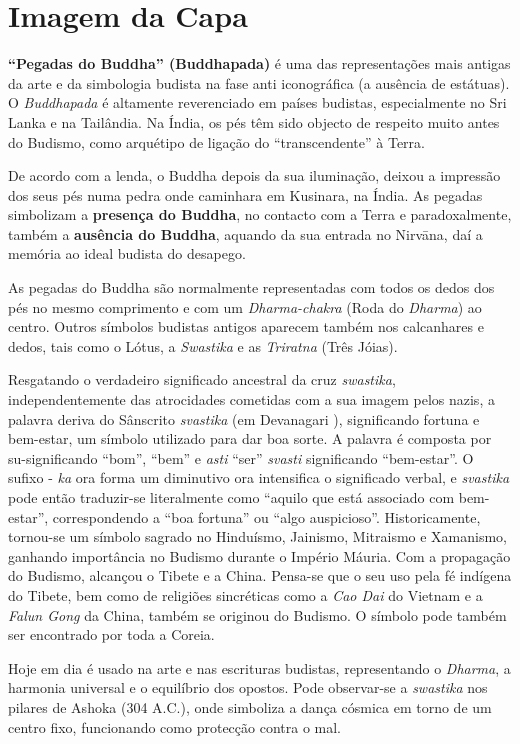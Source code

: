 \chapter{Imagem da Capa}

\textbf{``Pegadas do Buddha'' (Buddhapada)} é uma das representações mais
antigas da arte e da simbologia budista na fase anti iconográfica (a ausência de
estátuas). O \emph{Buddhapada} é altamente reverenciado em países budistas,
especialmente no Sri Lanka e na Tailândia. Na Índia, os pés têm sido objecto de
respeito muito antes do Budismo, como arquétipo de ligação do ``transcendente''
à Terra.

De acordo com a lenda, o Buddha depois da sua iluminação, deixou a impressão dos
seus pés numa pedra onde caminhara em Kusinara, na Índia. As pegadas simbolizam
a \textbf{presença do Buddha}, no contacto com a Terra e paradoxalmente, também
a \textbf{ausência do Buddha}, aquando da sua entrada no Nirvāna, daí a memória
ao ideal budista do desapego.

As pegadas do Buddha são normalmente representadas com todos os dedos dos pés no
mesmo comprimento e com um \emph{Dharma-chakra} (Roda do \emph{Dharma}) ao
centro. Outros símbolos budistas antigos aparecem também nos calcanhares e
dedos, tais como o Lótus, a \emph{Swastika} e as \emph{Triratna} (Três Jóias).

Resgatando o verdadeiro significado ancestral da cruz \emph{swastika},
independentemente das atrocidades cometidas com a sua imagem pelos nazis, a
palavra deriva do Sânscrito \emph{svastika} (em Devanagari ),
significando fortuna e bem-estar, um símbolo utilizado para dar boa sorte. A
palavra é composta por su-significando ``bom'', ``bem'' e \emph{asti} ``ser''
\emph{svasti} significando ``bem-estar''. O sufixo - \emph{ka} ora forma um
diminutivo ora intensifica o significado verbal, e \emph{svastika} pode então
traduzir-se literalmente como ``aquilo que está associado com bem-estar'',
correspondendo a ``boa fortuna'' ou ``algo auspicioso''. Historicamente,
tornou-se um símbolo sagrado no Hinduísmo, Jainismo, Mitraismo e Xamanismo,
ganhando importância no Budismo durante o Império Máuria. Com a propagação do
Budismo, alcançou o Tibete e a China. Pensa-se que o seu uso pela fé indígena do
Tibete, bem como de religiões sincréticas como a \emph{Cao Dai} do Vietnam e a
\emph{Falun Gong} da China, também se originou do Budismo. O símbolo pode também
ser encontrado por toda a Coreia.

Hoje em dia é usado na arte e nas escrituras budistas, representando o
\emph{Dharma}, a harmonia universal e o equilíbrio dos opostos. Pode observar-se
a \emph{swastika} nos pilares de Ashoka (304 A.C.), onde simboliza a dança
cósmica em torno de um centro fixo, funcionando como protecção contra o mal.

